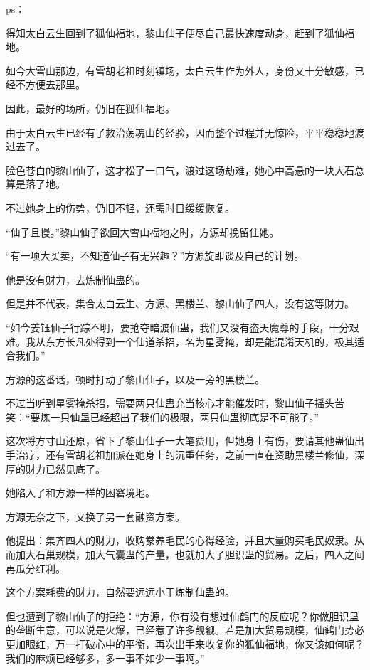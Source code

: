 
\begin{this_body}

ps：

得知太白云生回到了狐仙福地，黎山仙子便尽自己最快速度动身，赶到了狐仙福地。

如今大雪山那边，有雪胡老祖时刻镇场，太白云生作为外人，身份又十分敏感，已经不方便去那里。

因此，最好的场所，仍旧在狐仙福地。

由于太白云生已经有了救治荡魂山的经验，因而整个过程并无惊险，平平稳稳地渡过去了。

脸色苍白的黎山仙子，这才松了一口气，渡过这场劫难，她心中高悬的一块大石总算是落了地。

不过她身上的伤势，仍旧不轻，还需时日缓缓恢复。

“仙子且慢。”黎山仙子欲回大雪山福地之时，方源却挽留住她。

“有一项大买卖，不知道仙子有无兴趣？”方源旋即谈及自己的计划。

他是没有财力，去炼制仙蛊的。

但是并不代表，集合太白云生、方源、黑楼兰、黎山仙子四人，没有这等财力。

“如今姜钰仙子行踪不明，要抢夺暗渡仙蛊，我们又没有盗天魔尊的手段，十分艰难。我从东方长凡处得到一个仙道杀招，名为星雾掩，却是能混淆天机的，极其适合我们。”

方源的这番话，顿时打动了黎山仙子，以及一旁的黑楼兰。

不过当听到星雾掩杀招，需要两只仙蛊充当核心才能催发时，黎山仙子摇头苦笑：“要炼一只仙蛊已经超出了我们的极限，两只仙蛊彻底是不可能了。”

这次将方寸山还原，省下了黎山仙子一大笔费用，但她身上有伤，要请其他蛊仙出手治疗，还有雪胡老祖加派在她身上的沉重任务，之前一直在资助黑楼兰修仙，深厚的财力已然见底了。

她陷入了和方源一样的困窘境地。

方源无奈之下，又换了另一套融资方案。

他提出：集齐四人的财力，收购豢养毛民的心得经验，并且大量购买毛民奴隶。从而加大石巢规模，加大气囊蛊的产量，也就加大了胆识蛊的贸易。之后，四人之间再瓜分红利。

这个方案耗费的财力，自然要远远小于炼制仙蛊的。

但也遭到了黎山仙子的拒绝：“方源，你有没有想过仙鹤门的反应呢？你做胆识蛊的垄断生意，可以说是火爆，已经惹了许多觊觎。若是加大贸易规模，仙鹤门势必更加眼红，万一打破心中的平衡，再次出手来收复你的狐仙福地，你又该如何呢？我们的麻烦已经够多，多一事不如少一事啊。”


\end{this_body}
